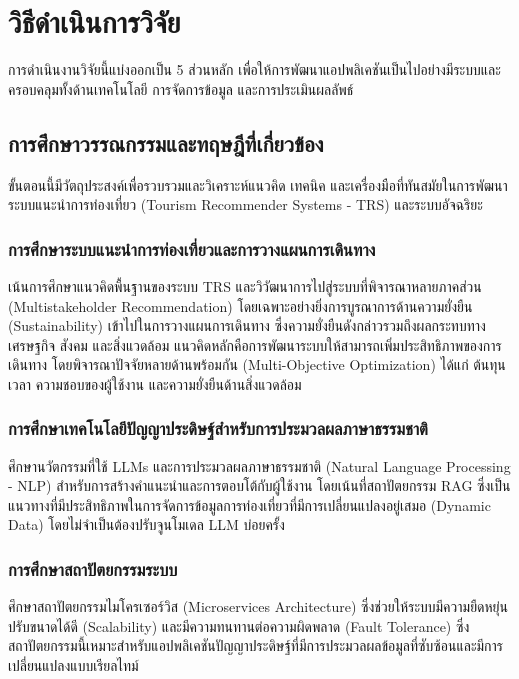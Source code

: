 \section{วิธีดำเนินการวิจัย}

การดำเนินงานวิจัยนี้แบ่งออกเป็น 5 ส่วนหลัก เพื่อให้การพัฒนาแอปพลิเคชันเป็นไปอย่างมีระบบและครอบคลุมทั้งด้านเทคโนโลยี การจัดการข้อมูล และการประเมินผลลัพธ์

\subsection{การศึกษาวรรณกรรมและทฤษฎีที่เกี่ยวข้อง}

ขั้นตอนนี้มีวัตถุประสงค์เพื่อรวบรวมและวิเคราะห์แนวคิด เทคนิค และเครื่องมือที่ทันสมัยในการพัฒนาระบบแนะนำการท่องเที่ยว (Tourism Recommender Systems - TRS) และระบบอัจฉริยะ

\subsubsection{การศึกษาระบบแนะนำการท่องเที่ยวและการวางแผนการเดินทาง}

เน้นการศึกษาแนวคิดพื้นฐานของระบบ TRS และวิวัฒนาการไปสู่ระบบที่พิจารณาหลายภาคส่วน (Multistakeholder Recommendation) โดยเฉพาะอย่างยิ่งการบูรณาการด้านความยั่งยืน (Sustainability) เข้าไปในการวางแผนการเดินทาง ซึ่งความยั่งยืนดังกล่าวรวมถึงผลกระทบทางเศรษฐกิจ สังคม และสิ่งแวดล้อม แนวคิดหลักคือการพัฒนาระบบให้สามารถเพิ่มประสิทธิภาพของการเดินทาง โดยพิจารณาปัจจัยหลายด้านพร้อมกัน (Multi-Objective Optimization) ได้แก่ ต้นทุน เวลา ความชอบของผู้ใช้งาน และความยั่งยืนด้านสิ่งแวดล้อม

\subsubsection{การศึกษาเทคโนโลยีปัญญาประดิษฐ์สำหรับการประมวลผลภาษาธรรมชาติ}

ศึกษานวัตกรรมที่ใช้ LLMs และการประมวลผลภาษาธรรมชาติ (Natural Language Processing - NLP) สำหรับการสร้างคำแนะนำและการตอบโต้กับผู้ใช้งาน โดยเน้นที่สถาปัตยกรรม RAG ซึ่งเป็นแนวทางที่มีประสิทธิภาพในการจัดการข้อมูลการท่องเที่ยวที่มีการเปลี่ยนแปลงอยู่เสมอ (Dynamic Data) โดยไม่จำเป็นต้องปรับจูนโมเดล LLM บ่อยครั้ง

\subsubsection{การศึกษาสถาปัตยกรรมระบบ}

ศึกษาสถาปัตยกรรมไมโครเซอร์วิส (Microservices Architecture) ซึ่งช่วยให้ระบบมีความยืดหยุ่น ปรับขนาดได้ดี (Scalability) และมีความทนทานต่อความผิดพลาด (Fault Tolerance) ซึ่งสถาปัตยกรรมนี้เหมาะสำหรับแอปพลิเคชันปัญญาประดิษฐ์ที่มีการประมวลผลข้อมูลที่ซับซ้อนและมีการเปลี่ยนแปลงแบบเรียลไทม์

